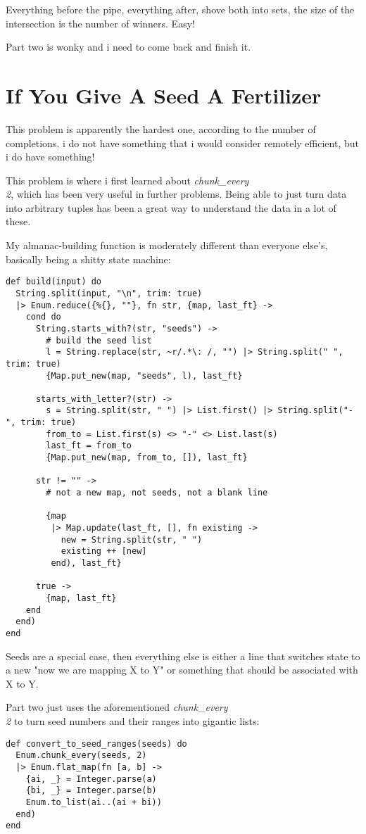 \documentclass{article}
\begin{document}
Everything before the pipe, everything after, shove both into sets, the size of the intersection is the number of winners. Easy!

Part two is wonky and i need to come back and finish it.

\section{If You Give A Seed A Fertilizer}
This problem is apparently the hardest one, according to the number of completions. i do not have something that i would consider remotely efficient, but i do have something!

This problem is where i first learned about \textit{chunk\_every\\2}, which has been very useful in further problems. Being able to just turn data into arbitrary tuples has been a great way to understand the data in a lot of these.

My almanac-building function is moderately different than everyone else's, basically being a shitty state machine:
\begin{verbatim}
def build(input) do
  String.split(input, "\n", trim: true)
  |> Enum.reduce({%{}, ""}, fn str, {map, last_ft} ->
    cond do
      String.starts_with?(str, "seeds") ->
        # build the seed list
        l = String.replace(str, ~r/.*\: /, "") |> String.split(" ", trim: true)
        {Map.put_new(map, "seeds", l), last_ft}

      starts_with_letter?(str) ->
        s = String.split(str, " ") |> List.first() |> String.split("-", trim: true)
        from_to = List.first(s) <> "-" <> List.last(s)
        last_ft = from_to
        {Map.put_new(map, from_to, []), last_ft}

      str != "" ->
        # not a new map, not seeds, not a blank line

        {map
         |> Map.update(last_ft, [], fn existing ->
           new = String.split(str, " ")
           existing ++ [new]
         end), last_ft}

      true ->
        {map, last_ft}
    end
  end)
end
\end{verbatim}

Seeds are a special case, then everything else is either a line that switches state to a new "now we are mapping X to Y" or something that should be associated with X to Y.

Part two just uses the aforementioned \textit{chunk\_every\\2} to turn seed numbers and their ranges into gigantic lists:
\begin{verbatim}
def convert_to_seed_ranges(seeds) do
  Enum.chunk_every(seeds, 2)
  |> Enum.flat_map(fn [a, b] ->
    {ai, _} = Integer.parse(a)
    {bi, _} = Integer.parse(b)
    Enum.to_list(ai..(ai + bi))
  end)
end
\end{verbatim}
\end{document}
